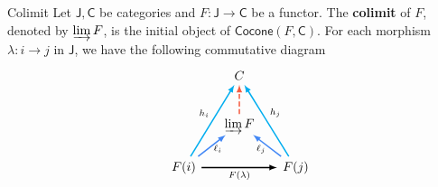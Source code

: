 \begin{definition}{Colimit}{}
    Let $\mathsf{J},\mathsf{C}$ be categories and $F:\mathsf{J}\to\mathsf{C}$ be a functor. 
    The \textbf{colimit} of $F$, denoted by $\varinjlim F$, is the initial object of $\mathsf{Cocone}(F,\textsf{C})$. For each morphism $\lambda:i\to j$ in $\mathsf{J}$, we have the following commutative diagram
    \[
        \begin{tikzcd}[ampersand replacement=\&, every arrow/.append style={-latex, line width=1.1pt}]
            \&   [-1.5em]                \&[-1em] C \& [-1em]                  \\[+0.2cm]
            \&                   \& \varinjlim F \arrow[u, dash pattern=on 4pt off 2pt, draw=arrowRed]         \&                   \\[-0.1cm]
        \& F(i) \arrow[ruu, draw=cyan, "h_i"]\arrow[ru, draw=arrowBlue, shorten >=-3.5pt, "\ell_i"' yshift=4.5pt]        \arrow[rr, "F(\lambda)"']\&   \& F(j)\arrow[luu, draw=cyan, "h_j"']\arrow[lu, draw=arrowBlue, shorten >=-3.7pt, "\ell_j" yshift=4.5pt] 
        \end{tikzcd}
    \]
\end{definition}


